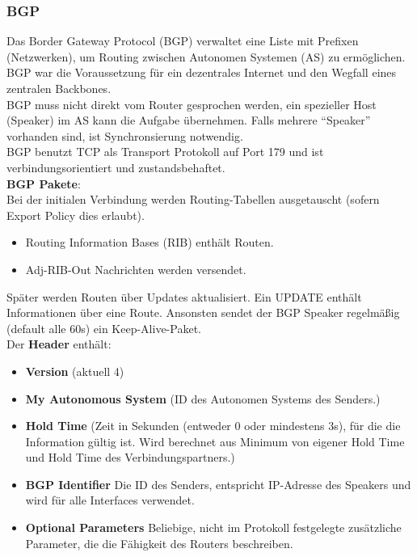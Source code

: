 \documentclass{article} %
\begin{document}
\subsubsection{BGP}
Das Border Gateway Protocol (BGP) verwaltet eine Liste mit Prefixen (Netzwerken), um Routing zwischen Autonomen Systemen (AS) zu ermöglichen. BGP war die Voraussetzung für ein dezentrales Internet und den Wegfall eines zentralen Backbones.\\
BGP muss nicht direkt vom Router gesprochen werden, ein spezieller Host (Speaker) im AS kann die Aufgabe übernehmen. Falls mehrere "`Speaker"' vorhanden sind, ist Synchronsierung notwendig.\\

\noindent BGP benutzt TCP als Transport Protokoll auf Port 179 und ist verbindungsorientiert und zustandsbehaftet. \\
\textbf{BGP Pakete}:\\
Bei der initialen Verbindung werden Routing-Tabellen ausgetauscht (sofern Export Policy dies erlaubt).
	\begin{itemize}
	\item Routing Information Bases (RIB) enthält Routen. 
	\item Adj-RIB-Out Nachrichten werden versendet. 
	\end{itemize}
Später werden Routen über Updates aktualisiert.  Ein UPDATE enthält Informationen über eine Route. Ansonsten sendet der BGP Speaker regelmäßig (default alle 
60s) ein Keep-Alive-Paket. \\

\noindent Der \textbf{Header} enthält:
	\begin{itemize}
	\item \textbf{Version} (aktuell 4)
	\item \textbf{My Autonomous System} (ID des Autonomen Systems des Senders.)
	\item \textbf{Hold Time} (Zeit in Sekunden (entweder 0 oder mindestens 3s), für die die Information gültig ist. Wird berechnet aus Minimum von eigener Hold Time und Hold Time des Verbindungspartners.)
	\item \textbf{BGP Identifier} Die ID des Senders, entspricht IP-Adresse des Speakers und wird für alle Interfaces verwendet.
	\item \textbf{Optional Parameters} Beliebige, nicht im Protokoll festgelegte zusätzliche Parameter, die die Fähigkeit des Routers beschreiben. 
	\end{itemize}
\end{document}
